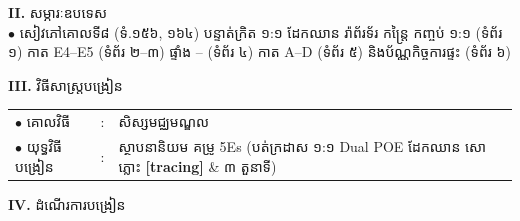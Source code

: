 \documentclass[a4paper,10pt]{article}
\newcommand{\cnum}[1]{{\fontsize{10.5pt}{12pt}\selectfont\ding{\numexpr181+#1\relax}}\hspace{0.2em}}
\begin{document}
{\vspace{2pt}

\textbf{II.} {\muol សម្ភារៈឧបទេស}\\[2pt]
\hspace*{0.55cm}$\bullet$ \hspace{0.35cm} សៀវភៅគោលទី៨ (ទំ.១៥៦, ១៦៤) បន្ទាត់ក្រិត ១:១ ដែកឈាន រ៉ាព័រទ័រ កន្ត្រៃ កញ្ចប់ ១:១ (ទំព័រ ១) កាត E4--E5 (ទំព័រ ២--៣) ផ្ទាំង \cnum{1}--\cnum{5} (ទំព័រ ៤) កាត A--D (ទំព័រ ៥) និងប័ណ្ណកិច្ចការផ្ទះ (ទំព័រ ៦)

\vspace{2pt}

\textbf{III.} {\muol វិធីសាស្រ្តបង្រៀន}\\[2pt]
\hspace*{0.55cm}%
\begin{tabular}{@{}l l l@{}}
  $\bullet$ \hspace{0.35cm} គោលវិធី & : \hspace{0.7cm} & សិស្សមជ្ឈមណ្ឌល \\
  $\bullet$ \hspace{0.35cm} យុទ្ធវិធីបង្រៀន & : & ស្ថាបនានិយម គម្រូ 5Es (បត់ក្រដាស ១:១ Dual POE ដែកឈាន សោភ្លោះ \textbf{[tracing]} \& ៣ តួនាទី) \\
\end{tabular}
}

\vspace{2pt}

\textbf{IV.} {\muol ដំណើរការបង្រៀន}

\vspace{-3pt}
\end{document}
